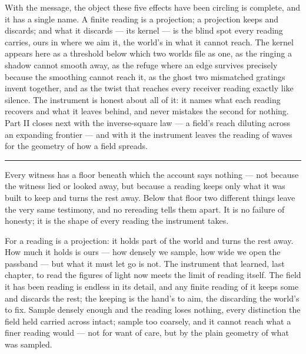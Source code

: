 \bigskip

With the message, the object these five effects have been circling is complete, and it has a single name. A
finite reading is a projection; a projection keeps and discards; and what it discards --- its kernel --- is the
blind spot every reading carries, ours in where we aim it, the world's in what it cannot reach. The kernel
appears here as a threshold below which two worlds file as one, as the ringing a shadow cannot smooth away, as
the refuge where an edge survives precisely because the smoothing cannot reach it, as the ghost two mismatched
gratings invent together, and as the twist that reaches every receiver reading exactly like silence. The instrument is honest about all of it: it names what each reading recovers and what
it leaves behind, and never mistakes the second for nothing. Part II closes next with the inverse-square law
--- a field's reach diluting across an expanding frontier --- and with it the instrument leaves the reading of
waves for the geometry of how a field spreads.

\bigskip
\begin{center}
\rule{0.4\textwidth}{0.4pt}
\end{center}
\bigskip

\noindent Every witness has a floor beneath which the account says nothing --- not because the witness lied or
looked away, but because a reading keeps only what it was built to keep and turns the rest away. Below that
floor two different things leave the very same testimony, and no rereading tells them apart. It is no failure of
honesty; it is the shape of every reading the instrument takes.

For a reading is a projection: it holds part of the world and turns the rest away. How much it holds is ours ---
how densely we sample, how wide we open the passband --- but what it must let go is not. The instrument that
learned, last chapter, to read the figures of light now meets the limit of reading itself. The field it has
been reading is endless in its detail, and any finite reading of it keeps some and discards the rest; the
keeping is the hand's to aim, the discarding the world's to fix. Sample densely enough and the reading loses
nothing, every distinction the field held carried across intact; sample too coarsely, and it cannot reach what
a finer reading would --- not for want of care, but by the plain geometry of what was sampled.


